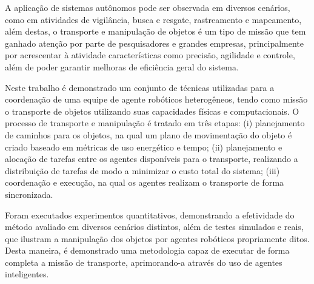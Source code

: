 A aplicação de sistemas autônomos pode ser observada em diversos cenários, como em atividades de vigilância, busca e resgate, rastreamento e mapeamento, além destas, o transporte e manipulação de objetos é um tipo de missão que tem ganhado atenção por parte de pesquisadores e grandes empresas, principalmente por acrescentar à atividade características como precisão, agilidade e controle, além de poder garantir melhoras de eficiência geral do sistema.

Neste trabalho é demonstrado um conjunto de técnicas utilizadas para a coordenação de uma equipe de agente robóticos heterogêneos, tendo como missão o transporte de objetos utilizando suas capacidades físicas e computacionais.
O processo de transporte e manipulação é tratado em três etapas: (i) planejamento de caminhos para os objetos, na qual um plano de movimentação do objeto é criado baseado em métricas de uso energético e tempo; (ii) planejamento e alocação de tarefas entre os agentes disponíveis para o transporte, realizando a distribuição de tarefas de modo a minimizar o custo total do sistema; (iii) coordenação e execução, na qual os agentes realizam o transporte de forma sincronizada.

Foram executados experimentos quantitativos, demonstrando a efetividade do método avaliado em diversos cenários distintos, além de testes simulados e reais, que ilustram a manipulação dos objetos por agentes robóticos propriamente ditos.
Desta maneira, é demonstrado uma metodologia capaz de executar de forma completa a missão de transporte, aprimorando-a através do uso de agentes inteligentes.





